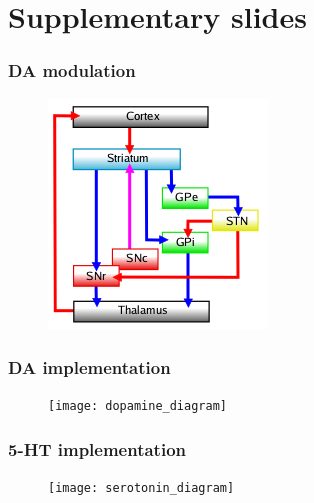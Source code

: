 \documentclass[12pt, aspectratio=169]{beamer}
\begin{document}
\section{Supplementary slides}
\begin{frame}
\frametitle{DA modulation}
\begin{figure}
\includegraphics[width=0.5\linewidth]{nigrostriatal}
\end{figure}
\end{frame}
\begin{frame}
\frametitle{DA implementation}
\begin{figure}
\texttt{[image: dopamine\_diagram]}
\end{figure}
\end{frame}
\begin{frame}
\frametitle{5-HT implementation}
\begin{figure}
\texttt{[image: serotonin\_diagram]}
\end{figure}
\end{frame}
\end{document}
